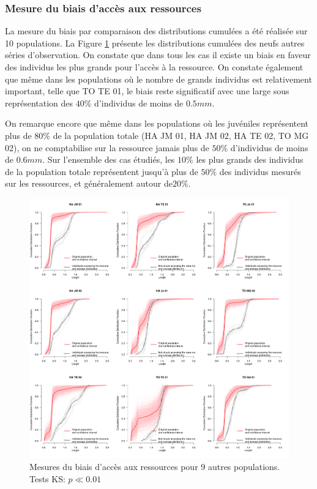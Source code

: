 \subsubsection{Mesure du biais d'accès aux ressources}

La mesure du biais par comparaison des distributions cumulées a été réalisée sur
10 populations. La Figure \ref{fig:SM7} présente les distributions cumulées des
neufs autres séries d'observation.
On constate que dans tous les cas il existe un biais en faveur des individus les
plus grands pour l'accès à la ressource. On constate également que même dans les
populations où le nombre de grands individus est relativement important, telle
que TO TE 01, le biais reste significatif avec une large sous représentation des
$40\%$ d'individus de moins de $0.5mm$.

On remarque encore que même dans les populations où les juvéniles représentent
plus de $80\%$ de la population totale (HA JM 01, HA JM 02, HA TE 02, TO MG 02),
on ne comptabilise sur la ressource jamais plus de $50\%$ d'individus de moins
de $0.6mm$. Sur l'ensemble des cas étudiés, les $10\%$ les plus grands des
individus de la population totale représentent jusqu'à plus de $50\%$ des
individus mesurés sur les ressources, et généralement autour de$20\%$.

\begin{figure}[!ht]
\begin{center}
\includegraphics[width=1\textwidth]{1_CorpsDeThese/Resumes/Fig/SM07}
\caption[Mesures du biais
d'accès aux ressources]{Mesures du biais
d'accès aux ressources pour 9 autres populations. Tests KS: $p \ll 0.01$}
\label{fig:SM7}
\end{center}
\end{figure}

